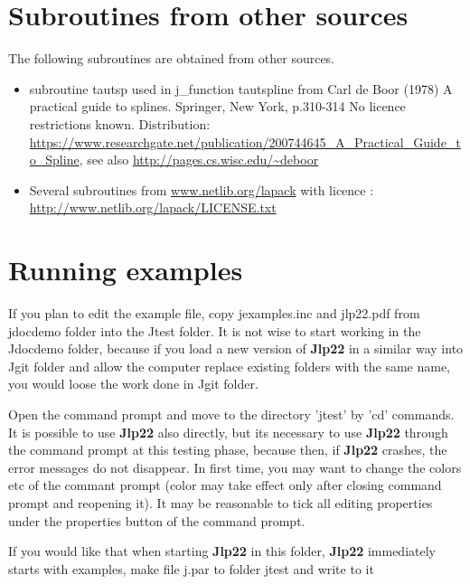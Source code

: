 \section{Subroutines from other sources} 
\label{license} 
The following subroutines are obtained from other sources. 
\begin{itemize} 
 
\item  subroutine tautsp used in j\_function tautspline 
from Carl de Boor (1978) A practical guide to splines. Springer, New York, p.310-314 
No licence restrictions known. 
Distribution: \\ 
\url{https://www.researchgate.net/publication/200744645_A_Practical_Guide_to_Spline}, 
see also \url{ http://pages.cs.wisc.edu/~deboor} 
 
 
 
\item Several subroutines from \url{www.netlib.org/lapack} 
with licence :\\ 
\url{http://www.netlib.org/lapack/LICENSE.txt} 
\end{itemize} 
\section{Running examples} 
\label{runex} 
 
If you plan to edit the example file, copy jexamples.inc and jlp22.pdf  from jdocdemo folder into the Jtest folder. 
It is not wise to start 
working in the Jdocdemo folder, because if you load a new version of \textbf{Jlp22} in a similar way into Jgit folder 
and allow the computer replace existing folders with the same name, 
you would loose the work done in Jgit folder. 
 
Open the command prompt and move to the directory 'jtest' by 'cd' commands. 
It is possible to use \textbf{Jlp22} also directly, but its necessary to use \textbf{Jlp22} through the command prompt 
at this testing phase, because then, if \textbf{Jlp22} crashes, the error messages do not disappear. 
In first time, you may want to change 
the colors etc of the commant prompt (color may take effect only after 
closing command prompt and reopening it). It may be reasonable to tick all editing 
properties under the properties button of the command prompt. 
 
If you would like that when starting \textbf{Jlp22} in this folder, \textbf{Jlp22} immediately starts with examples, 
make file j.par to folder jtest and write 
to it 
 
